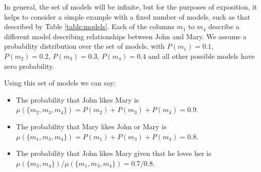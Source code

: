 \documentclass{svmult}
\begin{document}
In general, the set of models will be infinite, but for the purposes
of exposition, it helps to consider a simple example with a fixed
number of models, such as that described by Table
\ref{table:models}. Each of the columns $m_1$ to $m_4$ describe a
different model describing relationships between John and Mary.  We
assume a probability distribution over the set of models, with $P(m_1)
= 0.1$, $P(m_2) = 0.2$, $P(m_3) = 0.3$, $P(m_4) = 0.4$ and all other
possible models have zero probability.

Using this set of models we can say:
\begin{itemize}
\item The probability that John likes Mary is $\mu(\{m_2, m_3, m_4\}) =
  P(m_2) + P(m_3) + P(m_4) = 0.9$.
\item The probability that Mary likes John or Mary is $\mu(\{m_1, m_3, m_4\}) =
  P(m_1) + P(m_3) + P(m_4) = 0.8$.
\item The probability that John likes Mary given that he loves her
  is\\ $\mu(\{m_3, m_4\})/\mu(\{m_1, m_3, m_4\}) = 0.7/0.8$.
\end{itemize}



\end{document}
